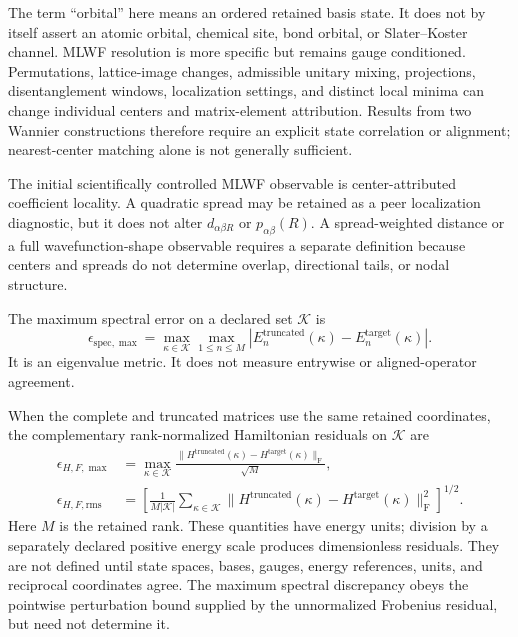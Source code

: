 The term ``orbital'' here means an ordered retained basis state. It does not by
itself assert an atomic orbital, chemical site, bond orbital, or Slater--Koster
channel. MLWF resolution is more specific but remains gauge conditioned.
Permutations, lattice-image changes, admissible unitary mixing, projections,
disentanglement windows, localization settings, and distinct local minima can
change individual centers and matrix-element attribution. Results from two
Wannier constructions therefore require an explicit state correlation or
alignment; nearest-center matching alone is not generally sufficient.

The initial scientifically controlled MLWF observable is center-attributed
coefficient locality. A quadratic spread may be retained as a peer localization
diagnostic, but it does not alter $d_{\alpha\beta R}$ or
$p_{\alpha\beta}(R)$. A spread-weighted distance or a full wavefunction-shape
observable requires a separate definition because centers and spreads do not
determine overlap, directional tails, or nodal structure.

The maximum spectral error on a declared set $\mathcal K$ is
\begin{equation}
  \epsilon_{\mathrm{spec},\max}
  =\max_{\kappa\in\mathcal K}
    \max_{1\leq n\leq M}
    \left|
      E_n^{\mathrm{truncated}}(\kappa)-E_n^{\mathrm{target}}(\kappa)
    \right|.
  \label{eq:training-composite-spectral-error}
\end{equation}
It is an eigenvalue metric. It does not measure entrywise or aligned-operator
agreement.

When the complete and truncated matrices use the same retained coordinates, the
complementary rank-normalized Hamiltonian residuals on $\mathcal K$ are
\begin{align}
  \epsilon_{H,F,\max}
  &=\max_{\kappa\in\mathcal K}
    \frac{\lVert H^{\mathrm{truncated}}(\kappa)
    -H^{\mathrm{target}}(\kappa)\rVert_{\mathrm F}}{\sqrt{M}},\\
  \epsilon_{H,F,\mathrm{rms}}
  &=\left[
    \frac{1}{M|\mathcal K|}
    \sum_{\kappa\in\mathcal K}
    \lVert H^{\mathrm{truncated}}(\kappa)
    -H^{\mathrm{target}}(\kappa)\rVert_{\mathrm F}^{2}
    \right]^{1/2}.
  \label{eq:training-composite-hamiltonian-errors}
\end{align}
Here $M$ is the retained rank. These quantities have energy units; division by a
separately declared positive energy scale produces dimensionless residuals. They are not
defined until state spaces, bases, gauges, energy references, units, and reciprocal
coordinates agree. The maximum spectral discrepancy obeys the pointwise perturbation
bound supplied by the unnormalized Frobenius residual, but need not determine it.


